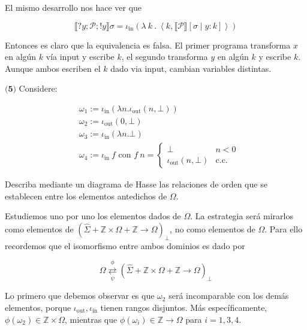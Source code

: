 \documentclass[article, 12pt]{article}
\begin{document}
El mismo desarrollo nos hace ver que 

\begin{equation*}
  \llbracket ?y ; \mathcal{P}; !y \rrbracket\sigma = \iota_{\text{in}}\left(
  \lambda ~ k ~ . ~ \left< k, \llbracket \mathcal{P} \rrbracket[\sigma \mid y : k] \right> \right) 
\end{equation*}

Entonces es claro que la equivalencia es falsa. El primer programa transforma
$x$ en algún $k$ vía input y escribe $k$, el segundo transforma $y$ en algún $k$
y escribe $k$. Aunque ambos escriben el $k$ dado via input, cambian variables
distintas.

\pagebreak 

\begin{myframe}
  
$\textbf{(5)}$ Considere: 

\begin{align*}
  &\omega_1 := \iota_\text{in}\left( \lambda n . \iota_{\text{out}}(n, \bot ) \right)  \\ 
  &\omega_2 := \iota_{\text{out}}(0, \bot ) \\ 
  &\omega_3 := \iota_{\text{in}}(\lambda n. \bot ) \\ 
  &\omega_4 := \iota_{\text{in}} ~ f \text{  con  } f ~ n = \begin{cases}
    \bot  & n < 0 \\ 
    \iota_{\text{out}}(n, \bot ) &\text{c.c.}
  \end{cases}
\end{align*}

Describa mediante un diagrama de Hasse las relaciones de orden que se establecen
entre los elementos antedichos de $\Omega$.

\end{myframe}

Estudiemos uno por uno los elementos dados de 
$\Omega $. La estrategia
será mirarlos como elementos de $\left( \hat{\Sigma}+ \mathbb{Z} \times \Omega +
\mathbb{Z} \to \Omega\right)_\bot$, no como elementos de $\Omega$. Para ello
recordemos que el isomorfismo entre ambos dominios es dado por


\begin{equation*}
  \Omega 
\underset{\psi}{\overset{\phi}{\rightleftarrows}} 
\left( \hat{\Sigma} + \mathbb{Z} \times \Omega + \mathbb{Z} \to \Omega\right)_{\perp}
\end{equation*}


Lo primero que debemos observar es que $\omega_2$ será incomparable
con los demás elementos, porque $\iota_{\text{out}}, \iota_{\text{in}}$ tienen
rangos disjuntos. Más específicamente, $\phi ( \omega_2 ) \in \mathbb{Z} \times \Omega$,
mientras que $\phi(\omega_i) \in \mathbb{Z} \to \Omega$ para $i = 1, 3, 4$.
\end{document}
